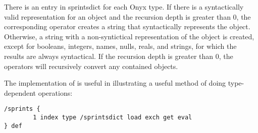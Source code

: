 There is an entry in sprintsdict for each Onyx type.  If there is a
syntactically valid representation for an object and the recursion depth is
greater than 0, the corresponding operator creates a string that syntactically
represents the object.  Otherwise, a string with a non-syntictical
representation of the object is created, except for booleans, integers, names,
nulls, reals, and strings, for which the results are always syntactical.  If the
recursion depth is greater than 0, the operators will recursively convert any
contained objects.

The implementation of  is
useful in illustrating a useful method of doing type-dependent operations:

\begin{verbatim}
/sprints {
        1 index type /sprintsdict load exch get eval
} def
\end{verbatim}

